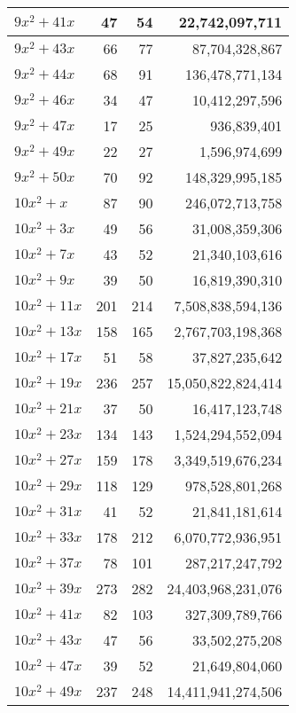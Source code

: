 \documentclass[a4paper]{amsproc}
\theoremstyle{plain}
\begin{document}
\begin{longtable}{ | l | r | r | r | }
$9x^2 + 41x$ & 47 & 54 & 22{,}742{,}097{,}711 \\ \hline
$9x^2 + 43x$ & 66 & 77 & 87{,}704{,}328{,}867 \\ \hline
$9x^2 + 44x$ & 68 & 91 & 136{,}478{,}771{,}134 \\ \hline
$9x^2 + 46x$ & 34 & 47 & 10{,}412{,}297{,}596 \\ \hline
$9x^2 + 47x$ & 17 & 25 & 936{,}839{,}401 \\ \hline
$9x^2 + 49x$ & 22 & 27 & 1{,}596{,}974{,}699 \\ \hline
$9x^2 + 50x$ & 70 & 92 & 148{,}329{,}995{,}185 \\ \hline
$10x^2 + x$ & 87 & 90 & 246{,}072{,}713{,}758 \\ \hline
$10x^2 + 3x$ & 49 & 56 & 31{,}008{,}359{,}306 \\ \hline
$10x^2 + 7x$ & 43 & 52 & 21{,}340{,}103{,}616 \\ \hline
$10x^2 + 9x$ & 39 & 50 & 16{,}819{,}390{,}310 \\ \hline
$10x^2 + 11x$ & 201 & 214 & 7{,}508{,}838{,}594{,}136 \\ \hline
$10x^2 + 13x$ & 158 & 165 & 2{,}767{,}703{,}198{,}368 \\ \hline
$10x^2 + 17x$ & 51 & 58 & 37{,}827{,}235{,}642 \\ \hline
$10x^2 + 19x$ & 236 & 257 & 15{,}050{,}822{,}824{,}414 \\ \hline
$10x^2 + 21x$ & 37 & 50 & 16{,}417{,}123{,}748 \\ \hline
$10x^2 + 23x$ & 134 & 143 & 1{,}524{,}294{,}552{,}094 \\ \hline
$10x^2 + 27x$ & 159 & 178 & 3{,}349{,}519{,}676{,}234 \\ \hline
$10x^2 + 29x$ & 118 & 129 & 978{,}528{,}801{,}268 \\ \hline
$10x^2 + 31x$ & 41 & 52 & 21{,}841{,}181{,}614 \\ \hline
$10x^2 + 33x$ & 178 & 212 & 6{,}070{,}772{,}936{,}951 \\ \hline
$10x^2 + 37x$ & 78 & 101 & 287{,}217{,}247{,}792 \\ \hline
$10x^2 + 39x$ & 273 & 282 & 24{,}403{,}968{,}231{,}076 \\ \hline
$10x^2 + 41x$ & 82 & 103 & 327{,}309{,}789{,}766 \\ \hline
$10x^2 + 43x$ & 47 & 56 & 33{,}502{,}275{,}208 \\ \hline
$10x^2 + 47x$ & 39 & 52 & 21{,}649{,}804{,}060 \\ \hline
$10x^2 + 49x$ & 237 & 248 & 14{,}411{,}941{,}274{,}506 \\ \hline

\end{longtable}
\end{document}
